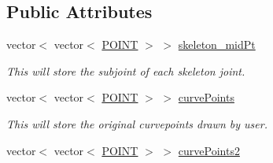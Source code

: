 \subsection*{\-Public \-Attributes}
\begin{DoxyCompactItemize}
\item 
\hypertarget{classCurvePoints_a82f3109e4d16251c4f1111f56701c861}{vector$<$ vector$<$ \hyperlink{structPOINT}{\-P\-O\-I\-N\-T} $>$ $>$ \hyperlink{classCurvePoints_a82f3109e4d16251c4f1111f56701c861}{skeleton\-\_\-mid\-Pt}}\label{classCurvePoints_a82f3109e4d16251c4f1111f56701c861}

\begin{DoxyCompactList}\small\item\em \-This will store the subjoint of each skeleton joint. \end{DoxyCompactList}\item 
\hypertarget{classCurvePoints_aa9adedc1a7b074e9092ffa8e088aaa1f}{vector$<$ vector$<$ \hyperlink{structPOINT}{\-P\-O\-I\-N\-T} $>$ $>$ \hyperlink{classCurvePoints_aa9adedc1a7b074e9092ffa8e088aaa1f}{curve\-Points}}\label{classCurvePoints_aa9adedc1a7b074e9092ffa8e088aaa1f}

\begin{DoxyCompactList}\small\item\em \-This will store the original curvepoints drawn by user. \end{DoxyCompactList}\item 
\hypertarget{classCurvePoints_a7a0e65db4b98a030d9468269e7928f50}{vector$<$ vector$<$ \hyperlink{structPOINT}{\-P\-O\-I\-N\-T} $>$ $>$ \hyperlink{classCurvePoints_a7a0e65db4b98a030d9468269e7928f50}{curve\-Points2}}\label{classCurvePoints_a7a0e65db4b98a030d9468269e7928f50}


\end{DoxyCompactItemize}
